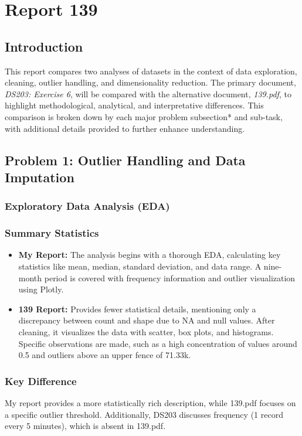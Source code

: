 \section{Report 139}

\subsection*{Introduction}
This report compares two analyses of datasets in the context of data exploration, cleaning, outlier handling, and dimensionality reduction. The primary document, \textit{DS203: Exercise 6}, will be compared with the alternative document, \textit{139.pdf}, to highlight methodological, analytical, and interpretative differences. This comparison is broken down by each major problem subsection* and sub-task, with additional details provided to further enhance understanding.

\subsection*{Problem 1: Outlier Handling and Data Imputation}

\subsubsection*{Exploratory Data Analysis (EDA)}

\subsubsection*{Summary Statistics}
\begin{itemize}
    \item \textbf{My Report:} The analysis begins with a thorough EDA, calculating key statistics like mean, median, standard deviation, and data range. A nine-month period is covered with frequency information and outlier visualization using Plotly.
    \item \textbf{139 Report:} Provides fewer statistical details, mentioning only a discrepancy between count and shape due to NA and null values. After cleaning, it visualizes the data with scatter, box plots, and histograms. Specific observations are made, such as a high concentration of values around 0.5 and outliers above an upper fence of 71.33k.
\end{itemize}

\subsubsection*{Key Difference}
My report provides a more statistically rich description, while 139.pdf focuses on a specific outlier threshold. Additionally, DS203 discusses frequency (1 record every 5 minutes), which is absent in 139.pdf.

